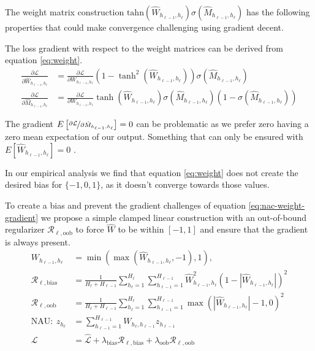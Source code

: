 The weight matrix construction $\mathrm{tahn}(\hat{W}_{h_{\ell-1},h_\ell}) \sigma(\hat{M}_{h_{\ell-1},h_\ell})$ has the following properties that could make convergence challenging using gradient decent.

The loss gradient with respect to the weight matrices can be derived from equation \ref{eq:weight}.
\begin{equation}
\begin{aligned}
\frac{\partial \mathcal{L}}{\partial \hat{W}_{h_{\ell-1},h_\ell}} &= \frac{\partial \mathcal{L}}{\partial W_{h_{\ell-1},h_\ell}} (1 - \tanh^2(\hat{W}_{h_{\ell-1},h_\ell})) \sigma(\hat{M}_{h_{\ell-1},h_\ell}) \\
\frac{\partial \mathcal{L}}{\partial \hat{M}_{h_{\ell-1},h_\ell}} &= \frac{\partial \mathcal{L}}{\partial W_{h_{\ell-1},h_\ell}} \tanh(\hat{W}_{h_{\ell-1},h_\ell}) \sigma(\hat{M}_{h_{\ell-1},h_\ell}) (1 - \sigma(\hat{M}_{h_{\ell-1},h_\ell}))
\end{aligned}
\label{eq:nac-weight-gradient}
\end{equation}

The gradient $E\left[\nicefrac{\partial \mathcal{L}}{\partial \hat{M}_{h_{\ell-1},h_\ell}}\right] = 0$ can be problematic as we prefer zero having a zero mean expectation of our output.
Something that can only be ensured with $E[\hat{W}_{h_{\ell-1},h_\ell}] = 0$ \cite{glorot-initialization}.

In our empirical analysis we find that equation \ref{eq:weight} does not create the desired bias for $\{-1, 0, 1\}$, as it doesn't converge towards those values.

To create a bias and prevent the gradient challenges of equation \ref{eq:nac-weight-gradient} we propose a simple clamped linear construction with an out-of-bound regularizer $\mathcal{R}_{\ell,\mathrm{oob}}$ to force $\hat{W}$ to be within $[-1, 1]$ and ensure that the gradient is always present.
\begin{equation}
\begin{aligned}
W_{h_{\ell-1},h_\ell} &= \min(\max(\hat{W}_{h_{\ell-1},h_\ell}, -1), 1), \\
\mathcal{R}_{\ell,\mathrm{bias}} &= \frac{1}{H_\ell + H_{\ell-1}} \sum_{h_\ell=1}^{H_\ell} \sum_{h_{\ell-1}=1}^{H_{\ell-1}} \hat{W}_{h_{\ell-1},h_\ell}^2 (1 - |\hat{W}_{h_{\ell-1},h_\ell}|)^2 \\
\mathcal{R}_{\ell,\mathrm{oob}} &= \frac{1}{H_\ell + H_{\ell-1}} \sum_{h_\ell=1}^{H_\ell} \sum_{h_{\ell-1}=1}^{H_{\ell-1}} \max(|\hat{W}_{h_{\ell-1},h_\ell}| - 1, 0)^2 \\
\textrm{NAU}:\ z_{h_\ell} &= \sum_{h_{\ell-1}=1}^{H_{\ell-1}} W_{h_{\ell}, h_{\ell-1}} z_{h_{\ell-1}} \\
\mathcal{L} &= \hat{\mathcal{L}} + \lambda_{\mathrm{bias}} \mathcal{R}_{\ell,\mathrm{bias}} + \lambda_{\mathrm{oob}} \mathcal{R}_{\ell,\mathrm{oob}}
\end{aligned}
\end{equation}

